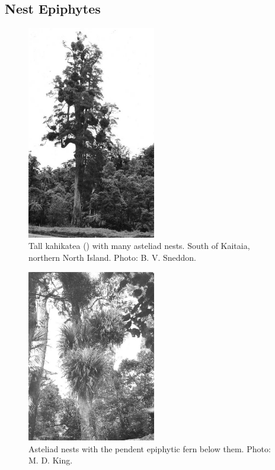 \subsection{Nest Epiphytes}

\begin{figure}
	\includegraphics[width=0.5\textwidth]{graphics/figure39kahikatea.jpg}
	\centering
	\caption[Tall kahikatea with many asteliad nests]{Tall kahikatea () with many asteliad nests.
	South of Kaitaia, northern North Island.
	Photo: B. V. Sneddon.}%
	\label{fig:39kahikatea}
\end{figure}

\begin{figure}
	\includegraphics[width=0.5\textwidth]{graphics/figure40asteliad.jpg}
	\centering
	\caption[Asteliad nests with the pendent epiphytic fern]{Asteliad nests with the pendent epiphytic fern  below them.
	Photo: M. D. King.}%
	\label{fig:40asteliad}
\end{figure}


